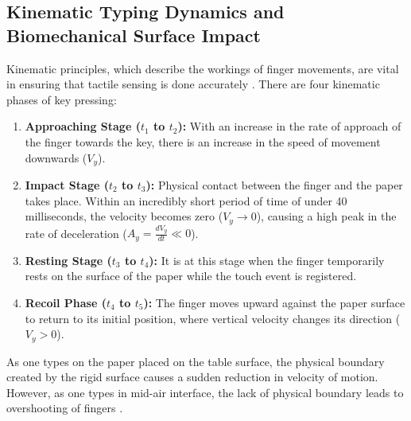\subsection{Kinematic Typing Dynamics and Biomechanical Surface Impact}
\label{subsec:lit_typing_biomechanics}
Kinematic principles, which describe the workings of finger movements, are vital in ensuring that tactile sensing is done accurately \cite{Simao2016Unsupervised, MacRitchie2015Integrating, Pilkov2024Markerless}. There are four kinematic phases of key pressing:
\begin{enumerate}
    \item \textbf{Approaching Stage ($t_1$ to $t_2$):} With an increase in the rate of approach of the finger towards the key, there is an increase in the speed of movement downwards ($V_y$).
    \item \textbf{Impact Stage ($t_2$ to $t_3$):} Physical contact between the finger and the paper takes place. Within an incredibly short period of time of under 40 milliseconds, the velocity becomes zero ($V_y \to 0$), causing a high peak in the rate of deceleration ($A_y = \frac{dV_y}{dt} \ll 0$).
    \item \textbf{Resting Stage ($t_3$ to $t_4$):} It is at this stage when the finger temporarily rests on the surface of the paper while the touch event is registered.
    \item \textbf{Recoil Phase ($t_4$ to $t_5$):} The finger moves upward against the paper surface to return to its initial position, where vertical velocity changes its direction ($V_y > 0$).
\end{enumerate}
As one types on the paper placed on the table surface, the physical boundary created by the rigid surface causes a sudden reduction in velocity of motion. However, as one types in mid-air interface, the lack of physical boundary leads to overshooting of fingers \cite{Boletsis2019TextInput}.

